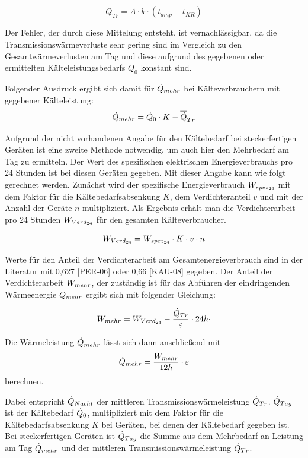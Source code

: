 \begin{equation}
	\overline{\dot{Q}}_{Tr} = A \cdot k \cdot \left( t_{amp} - \overline{t}_{KR} \right)
\label{ptrans}
\end{equation}

Der Fehler, der durch diese Mittelung entsteht, ist vernachlässigbar, da die Transmissionswärmeverluste sehr gering sind im
Vergleich zu den Gesamtwärmeverlusten am Tag und diese aufgrund des gegebenen oder ermittelten Kälteleistungsbedarfs $Q_0$
konstant sind.

Folgender Ausdruck ergibt sich damit für $\dot{Q}_{mehr}$ bei Kälteverbrauchern mit gegebener Kälteleistung:
\begin{equation}
	\pmehr = \pkalt \cdot K - \overline{\dot{Q}}_{Tr}%
\label{pmehr}
\end{equation}

Aufgrund der nicht vorhandenen Angabe für den Kältebedarf bei steckerfertigen Geräten ist eine zweite Methode notwendig, um
auch hier den Mehrbedarf am Tag zu ermitteln. Der Wert des spezifischen elektrischen Energieverbrauchs pro 24 Stunden ist bei
diesen Geräten gegeben. Mit dieser Angabe kann wie folgt gerechnet werden. Zunächst wird der spezifische Energieverbrauch
${W}_{spez_{24}}$ mit dem Faktor für die Kältebedarfsabsenkung $K$, dem Verdichteranteil $v$ und mit der Anzahl der Geräte $n$
multipliziert.  Als Ergebnis erhält man die Verdichterarbeit pro 24 Stunden ${W}_{Verd_{24}}$ für den gesamten Kälteverbraucher.

\begin{equation}
	\lverd = \lspez \cdot K \cdot v \cdot n
\label{lverd}
\end{equation}

Werte für den Anteil der Verdichterarbeit am Gesamtenergieverbrauch sind in der Literatur mit 0,627 [PER-06] oder 0,66
[KAU-08] gegeben.  Der Anteil der Verdichterarbeit ${W}_{mehr}$, der zuständig ist für das Abführen der eindringenden Wärmeenergie
$Q_{mehr}$ ergibt sich mit folgender Gleichung:

\begin{equation}
	\lmehr = \lverd - \frac{\ptrans}{\epsilon} \cdot 24h \cdot
\label{lmehr}
\end{equation}

Die Wärmeleistung $\dot{Q}_{mehr}$ lässt sich dann anschließend mit
\begin{equation}
	\pmehr = \frac{\lmehr}{12h} \cdot \epsilon
\label{<++>}
\end{equation}
berechnen.

Dabei entspricht $\dot{Q}_{Nacht}$ der mittleren Transmissionswärmeleistung $\dot{Q}_{Tr}$. $\dot{Q}_{Tag}$ ist der Kältebedarf $\dot{Q}_{0}$,
multipliziert mit dem Faktor für die Kältebedarfsabsenkung $K$ bei Geräten, bei denen der Kältebedarf gegeben ist. Bei
steckerfertigen Geräten ist $\dot{Q}_{Tag}$ die Summe aus dem Mehrbedarf an Leistung am Tag $\dot{Q}_{mehr}$ und der mittleren
Transmissionswärmeleistung $\dot{Q}_{Tr}$.


